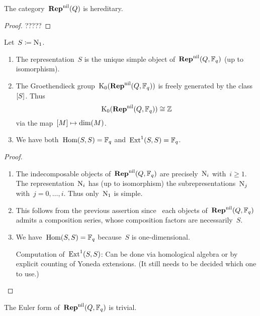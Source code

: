 \documentclass[a4paper,11pt]{scrartcl}
\begin{document}
\begin{proposition}
  The category~$\mathbf{Rep}^{\mathrm{nil}}(Q)$ is hereditary.
\end{proposition}

\begin{proof}
  ?????
\end{proof}

\begin{lemma}
  Let~$S \coloneqq \mathrm{N}_1$.
  \begin{enumerate}
    \item
      The representation~$S$ is the unique simple object of~$\mathbf{Rep}^{\mathrm{nil}}(Q, \mathbb{F}_q)$ (up to isomorphism).
    \item
      The Groethendieck group~$\operatorname{K}_0(\mathbf{Rep}^{\mathrm{nil}}(Q, \mathbb{F}_q))$ is freely generated by the class~$[S]$.
      Thus
      \[
        \operatorname{K}_0(\mathbf{Rep}^{\mathrm{nil}}(Q, \mathbb{F}_q))
        \cong
        \mathbb{Z}
      \]
      via the map~$[M] \mapsto \dim(M)$.
    \item
      We have both~$\operatorname{Hom}(S, S) = \mathbb{F}_q$ and~$\operatorname{Ext}^1(S,S) = \mathbb{F}_q$.
  \end{enumerate}
\end{lemma}

\begin{proof}
  \leavevmode
  \begin{enumerate}
    \item
      The indecomposable objects of~$\mathbf{Rep}^{\mathrm{nil}}(Q, \mathbb{F}_q)$ are precisely~$\mathrm{N}_i$ with~$i \geq 1$.
      The representation~$\mathrm{N}_i$ has (up to isomorphism) the subrepresentations~$\mathrm{N}_j$ with~$j = 0, \dotsc, i$.
      Thus only~$\mathrm{N}_1$ is simple.
    \item
      This follows from the previous assertion since~ each objects of~$\mathbf{Rep}^{\mathrm{nil}}(Q, \mathbb{F}_q)$ admits a composition series, whose composition factors are necessarily~$S$.
    \item
      We have~$\operatorname{Hom}(S, S) = \mathbb{F}_q$ because~$S$ is one-dimensional.
      
      Computation of~$\operatorname{Ext}^1(S,S)$:
      Can be done via homological algebra or by explicit counting of Yoneda extensions.
      (It still needs to be decided which one to use.)
    \qedhere
  \end{enumerate}
\end{proof}

\begin{corollary}
  The Euler form of~$\mathbf{Rep}^{\mathrm{nil}}(Q, \mathbb{F}_q)$ is trivial.
\end{corollary}
\end{document}
